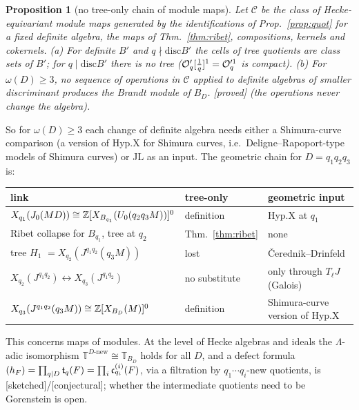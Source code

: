 \documentclass[11pt]{amsart}
\theoremstyle{plain}
\newtheorem{proposition}[theorem]{Proposition}
\theoremstyle{definition}
\theoremstyle{remark}
\newcommand{\status}[1]{\textup{\textsf{[#1]}}}
\newcommand{\stproved}{\status{proved}}
\newcommand{\stsketch}{\status{sketched}}
\newcommand{\stconj}{\status{conjectural}}
\newcommand{\T}{\mathbb{T}}\newcommand{\m}{\mathfrak{m}}\newcommand{\cT}{\mathcal{T}}\newcommand{\cX}{\mathcal{X}}
\begin{document}
\begin{proposition}[no tree-only chain of module maps]\label{prop:noChain}
Let $\mathcal C$ be the class of Hecke-equivariant module maps generated by the identifications of Prop.~\ref{prop:quot} for a fixed definite algebra, the maps of Thm.~\ref{thm:ribet}, compositions, kernels and cokernels. (a) For definite $B'$ and $q\nmid\mathrm{disc}B'$ the cells of tree quotients are class sets of $B'$; for $q\mid\mathrm{disc}B'$ there is no tree ($\mathcal{O}'_q[\frac1q]^1=\mathcal{O}'^1_q$ is compact). (b) For $\omega(D)\ge3$, no sequence of operations in $\mathcal C$ applied to definite algebras of smaller discriminant produces the Brandt module of $B_D$. \stproved{} (the operations never change the algebra).
\end{proposition}
So for $\omega(D)\ge3$ each change of definite algebra needs either a Shimura-curve comparison (a version of $\mathrm{Hyp.X}$ for Shimura curves, i.e.\ Deligne--Rapoport-type models of Shimura curves) or JL as an input. The geometric chain for $D=q_1q_2q_3$ is:
\begin{center}\small
\begin{tabular}{@{}p{5.6cm}p{3.6cm}p{4.6cm}@{}}
\toprule
link & tree-only & geometric input\\\midrule
$X_{q_1}(J_0(MD))\cong\mathbb{Z}[X_{B_{q_1}}(U_0(q_2q_3M))]^0$ & definition & $\mathrm{Hyp.X}$ at $q_1$\\
Ribet collapse for $B_{q_1}$, tree at $q_2$ & Thm.~\ref{thm:ribet} & none\\
tree $H_1$ $=X_{q_2}(J^{q_1q_2}(q_3M))$ & lost & Čerednik--Drinfeld\\
$X_{q_2}(J^{q_1q_2})\leftrightarrow X_{q_3}(J^{q_1q_2})$ & no substitute & only through $T_\ell J$ (Galois)\\
$X_{q_3}(J^{q_1q_2}(q_3M))\cong\mathbb{Z}[X_{B_D}(M)]^0$ & definition & Shimura-curve version of $\mathrm{Hyp.X}$\\
\bottomrule
\end{tabular}
\end{center}
This concerns maps of modules. At the level of Hecke algebras and ideals the $\Lambda$-adic isomorphism $\T^{D\text{-new}}\cong\T_{B_D}$ holds for all $D$, and a defect formula $(h_F)=\prod_{q\mid D}\mathfrak{t}_q(F)=\prod_i\mathfrak{c}^{(i)}_{q_i}(F)$, via a filtration by $q_1\cdots q_i$-new quotients, is \stsketch{}/\stconj; whether the intermediate quotients need to be Gorenstein is open.

\end{document}
